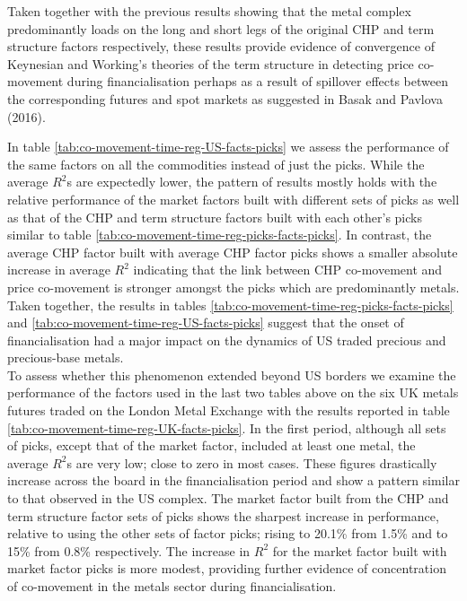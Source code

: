 \documentclass[]{elsarticle} %
\begin{document}
Taken together with the previous results showing that the metal complex predominantly loads on the long and short legs of the original CHP and term structure factors respectively, these results provide evidence of convergence of Keynesian and Working's theories of the term structure in detecting price co-movement during financialisation perhaps as a result of spillover effects between the corresponding futures and spot markets as suggested in Basak and Pavlova (2016).

\medskip\setlength{\parindent}{0pt}

In table \ref{tab:co-movement-time-reg-US-facts-picks} we assess the performance of the same factors on all the commodities instead of just the picks. While the average \(R^{2}\)s are expectedly lower, the pattern of results mostly holds with the relative performance of the market factors built with different sets of picks as well as that of the CHP and term structure factors built with each other's picks similar to table \ref{tab:co-movement-time-reg-picks-facts-picks}. In contrast, the average CHP factor built with average CHP factor picks shows a smaller absolute increase in average \(R^{2}\) indicating that the link between CHP co-movement and price co-movement is stronger amongst the picks which are predominantly metals. Taken together, the results in tables \ref{tab:co-movement-time-reg-picks-facts-picks} and \ref{tab:co-movement-time-reg-US-facts-picks} suggest that the onset of financialisation had a major impact on the dynamics of US traded precious and precious-base metals.\\
To assess whether this phenomenon extended beyond US borders we examine the performance of the factors used in the last two tables above on the six UK metals futures traded on the London Metal Exchange with the results reported in table \ref{tab:co-movement-time-reg-UK-facts-picks}. In the first period, although all sets of picks, except that of the market factor, included at least one metal, the average \(R^{2}\)s are very low; close to zero in most cases. These figures drastically increase across the board in the financialisation period and show a pattern similar to that observed in the US complex. The market factor built from the CHP and term structure factor sets of picks shows the sharpest increase in performance, relative to using the other sets of factor picks; rising to 20.1\% from 1.5\% and to 15\% from 0.8\% respectively. The increase in \(R^{2}\) for the market factor built with market factor picks is more modest, providing further evidence of concentration of co-movement in the metals sector during financialisation.\\
\end{document}
